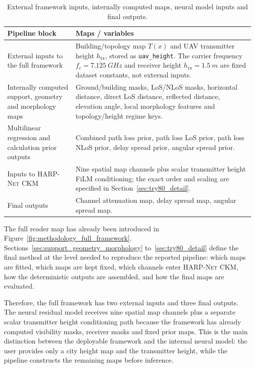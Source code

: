 \begin{table}[H]
\centering
\caption{External framework inputs, internally computed maps, neural model
inputs and final outputs.}
\label{tab:framework_io_summary}
\small
\begin{tabularx}{\textwidth}{>{\raggedright\arraybackslash}p{}
>{\raggedright\arraybackslash}X}
\toprule
Pipeline block & Maps / variables \\
\midrule
External inputs to the full framework &
Building/topology map \(T(x)\) and UAV transmitter height \(h_{\mathrm{tx}}\), stored as \texttt{uav\_height}. The carrier frequency \(f_c=\SI{7.125}{GHz}\) and receiver height \(h_{\mathrm{rx}}=\SI{1.5}{m}\) are fixed dataset constants, not external inputs. \\
Internally computed support, geometry and morphology maps &
Ground/building masks, LoS/NLoS masks, horizontal distance, direct LoS distance, reflected distance, elevation angle, local morphology features and topology/height regime keys. \\
Multilinear regression and calculation prior outputs &
Combined path loss prior, path loss LoS prior, path loss NLoS prior,
delay spread prior, angular spread prior. \\
Inputs to \textsc{HARP-Net CKM} &
Nine spatial map channels plus scalar transmitter height FiLM conditioning;
the exact order and scaling are specified in Section~\ref{sec:try80_detail}. \\
Final outputs &
Channel attenuation map, delay spread map, angular spread map. \\
\bottomrule
\end{tabularx}
\end{table}

The full reader map has already been introduced in
Figure~\ref{fig:methodology_full_framework}. Sections~\ref{sec:support_geometry_morphology}
to~\ref{sec:try80_detail} define the final method at the level needed to
reproduce the reported pipeline: which maps are fitted, which maps are kept fixed,
which channels enter \textsc{HARP-Net CKM}, how the deterministic outputs are
assembled, and how the final maps are evaluated.

Therefore, the full framework has two external inputs and three final outputs.
The neural residual model receives nine spatial map channels plus a separate
scalar transmitter height conditioning path because the framework has already computed
visibility masks, receiver masks and fixed prior maps. This is the main
distinction between the deployable framework and the internal neural model: the
user provides only a city height map and the transmitter height, while the pipeline
constructs the remaining maps before inference.

